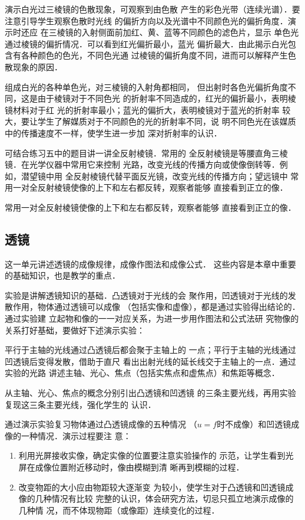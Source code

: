 演示白光过三棱镜的色散现象，可观察到由色散
产生的彩色光带（连续光谱）．要注意引导学生观察色散时光线
的偏折方向以及光谱中不同颜色光的偏折角度．演示时还应
在三棱镜的入射侧面前加红、黄、蓝等不同颜色的滤色片，显示
单色光通过棱镜的偏折情况．可以看到红光偏折最小，蓝光
偏折最大．由此揭示白光包含有各种颜色的色光，不同色光通
过棱镜的偏折角度不同，进而可以解释产生色散现象的原因．

组成白光的各种单色光，对三棱镜的入射角都相同，
但出射时各色光偏折角度不同，这是由于棱镜对于不同色光
的折射率不同造成的，红光的偏折最小，表明棱镜材料对于红
光的折射率最小；蓝光的偏折大，表明棱镜对于蓝光的折射率
较大，要让学生了解媒质对于不同颜色的光的折射率不同，说
明不同色光在该媒质中的传播速度不一样，使学生进一步加
深对折射率的认识．

可结合练习五中的题目讲一讲全反射棱镜．常用的
全反射棱镜是等腰直角三棱镜．在光学仪器中常用它来控制
光路，改变光线的传播方向或使像倒转等．例如，潜望镜中用
全反射棱镜代替平面反光镜，改变光线的传播方向；望远镜中
常用一对全反射棱镜使像的上下和左右都反转，观察者能够
直接看到正立的像．

常用一对全反射棱镜使像的上下和左右都反转，观察者能够
直接看到正立的像．

\subsection{透镜}
这一单元讲述透镜的成像规律，成像作图法和成像公式．
这些内容是本章中重要的基础知识，也是教学的重点．

实验是讲解透镜知识的基础．凸透镜对于光线的会
聚作用，凹透镜对于光线的发散作用，物体通过透镜可以成像
（包括实像和虚像），都是通过实验得出结论的．通过实验建
立起物和像的一一对应关系，为进一步用作图法和公式法研
究物像的关系打好基础，要做好下述演示实验：

平行于主轴的光线通过凸透镜后都会聚于主轴上的
一点；平行于主轴的光线通过凹透镜后变得发散，借助于直尺
看出出射光线的延长线交于主轴上的一点．通过实验的光路
讲述主轴、光心、焦点（包括实焦点和虚焦点）和焦距等概念．

从主轴、光心、焦点的概念分别引出凸透镜和凹透镜
的三条主要光线，再用实验复现这三条主要光线，强化学生的
认识．

通过演示实验复习物体通过凸透镜成像的五种情况
（$u=f$时不成像）和凹透镜成像的一种情况．演示过程要注
意：
\begin{enumerate}
\item 利用光屏接收实像，确定实像的位置要注意实验操作的
示范，让学生看到光屏在成像位置附近移动时，像由模糊到清
晰再到模糊的过程．
\item 改变物距的大小应由物距较大逐渐变
为较小，使学生对于凸透镜和凹透镜成像的几种情况有比较
完整的认识，体会研究方法，切忌只孤立地演示成像的几种情
况，而不体现物距（或像距）连续变化的过程．
\end{enumerate}

